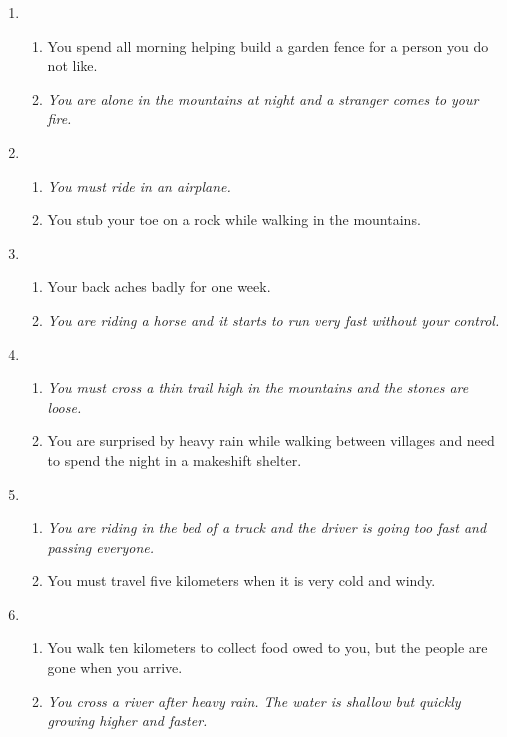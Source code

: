 \documentclass[idxtotoc,hyperref,openany]{labbook} %
\begin{document}
\begin{enumerate}
\item \begin{enumerate} 
\item  You spend all morning helping build a garden fence for a person you do not like.
\item   \emph{You are alone in the mountains at night and a stranger comes to your fire.}
\end{enumerate}

\item \begin{enumerate} 
\item  \emph{You must ride in an airplane.}
\item   You stub your toe on a rock while walking in the mountains.
\end{enumerate}

\item \begin{enumerate} 
\item  Your back aches badly for one week.
\item   \emph{You are riding a horse and it starts to run very fast without your control.}
\end{enumerate}

\item \begin{enumerate} 
\item  \emph{You must cross a thin trail high in the mountains and the stones are loose.}
\item   You are surprised by heavy rain while walking between villages and need to spend the night in a makeshift shelter.
\end{enumerate}

\item \begin{enumerate} 
\item  \emph{You are riding in the bed of a truck and the driver is going too fast and passing everyone.}
\item   You must travel five kilometers when it is very cold and windy.
\end{enumerate}

\item \begin{enumerate} 
\item  You walk ten kilometers to collect food owed to you, but the people are gone when you arrive.
\item   \emph{You cross a river after heavy rain. The water is shallow but quickly growing higher and faster.}
\end{enumerate}


\end{enumerate}
\end{document}
